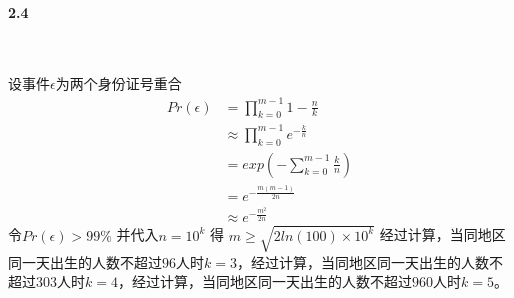 \paragraph{2.4}~{}

设事件$\epsilon$为两个身份证号重合
$$
\begin{aligned}
    Pr(\epsilon) &= \prod_{k=0}^{m-1}{1-\frac{n}{k}}\\
    &\approx \prod_{k=0}^{m-1}{e^{-\frac{k}{n}}}\\
    &=exp(-\sum_{k=0}^{m-1}{\frac{k}{n}})\\
    &=e^{-\frac{m(m-1)}{2n}}\\
    &\approx e^{-\frac{m^2}{2n}}
\end{aligned}
$$
令$Pr(\epsilon) > 99\%$ 并代入$n=10^k$ 得 $m \ge \sqrt{2ln(100)\times 10^k}$
经过计算，当同地区同一天出生的人数不超过$96$人时$k=3$，经过计算，当同地区同一天出生的人数不超过$303$人时$k=4$，经过计算，当同地区同一天出生的人数不超过$960$人时$k=5$。